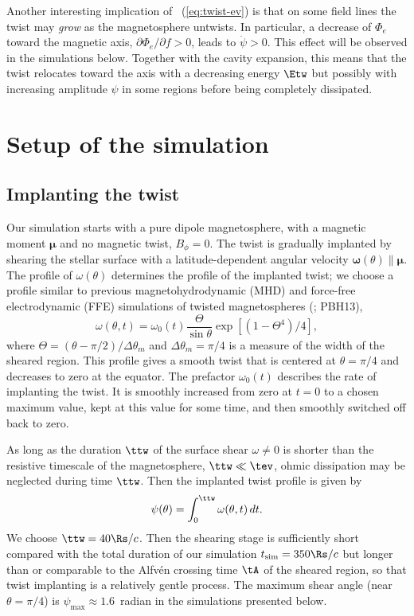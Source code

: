 Another interesting implication of \Eq~(\ref{eq:twist-ev}) is that on some field
lines the twist may {\it grow} as the magnetosphere untwists. In particular, a
decrease of $\Phi_e$ toward the magnetic axis, $\partial\Phi_e/\partial f>0$,
leads to $\dot{\psi}>0$. This effect will be observed in the simulations below.
Together with the cavity expansion, this means that the twist relocates toward
the axis with a decreasing energy $\Etw$ but possibly
with
increasing amplitude $\psi$ in some regions before being completely dissipated.


\section{Setup of the simulation}
\label{sec:setup}

\subsection{Implanting the twist}
\label{sec:implant}

Our simulation starts with a pure dipole magnetosphere, with a magnetic moment
${\mathbf \mu}$ and no magnetic twist, $B_\phi=0$. The twist is gradually
implanted by shearing the stellar surface with a latitude-dependent angular
velocity $\boldsymbol{\omega}(\theta)\parallel\boldsymbol{\mu}$. The profile of
$\omega(\theta)$ determines the profile of the implanted twist; we choose a
profile similar to previous magnetohydrodynamic (MHD) and force-free
electrodynamic (FFE) simulations of twisted magnetospheres
(\citealt{1994ApJ...430..898M}; PBH13),
\begin{equation}
  \label{eq:3}
  \omega(\theta,t) = \omega_0(t)\frac{\Theta}{\sin\theta}\exp \left[ (1 - \Theta^4)/4 \right],
\end{equation}
where $\Theta = (\theta - \pi/2)/\Delta\theta_m$ and $\Delta \theta_m = \pi/4$
is a measure of the width of the sheared region. This profile gives a smooth
twist that is centered at $\theta=\pi/4$ and decreases to zero at the equator.
The prefactor $\omega_0(t)$ describes the rate of implanting the twist. It is
smoothly increased from zero at $t=0$ to a chosen maximum value, kept at this
value for some time, and then smoothly switched off back to zero.

As long as the duration $\ttw$ of the surface shear $\omega\neq 0$ is shorter than
the resistive timescale of the magnetosphere, $\ttw\ll\tev$, ohmic dissipation
may be neglected during time $\ttw$. Then the implanted twist profile is given
by
\begin{equation}
  \psi(\theta)=\int_0^{\ttw}\omega(\theta,t)\,dt.
\end{equation}
We choose $\ttw=40 \Rs/c$. Then the shearing stage is sufficiently short
compared with the total duration of our simulation $t_\mathrm{sim} = 350\Rs/c$
but longer than or comparable to the Alfv\'en crossing time $\tA$ of the sheared
region, so that twist implanting is a relatively gentle process. The maximum
shear angle (near $\theta=\pi/4$) is $\psi_{\max}\approx 1.6$~radian in the
simulations presented below.

